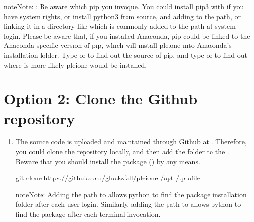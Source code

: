\documentclass[letterpaper,10pt,english]{sphinxmanual}
\begin{document}
\begin{enumerate}
\begin{sphinxadmonition}{note}{Note:}
:
Be aware which pip you invoque. You could install pip3 with
 if you have system rights, or
install python3 from source, and adding  to the
path, or linking it in a directory like  which is commonly
added to the path at system login. Please be aware that, if you installed
Anaconda, pip could be linked to the Anaconda specific version of pip, which
will install pleione into Anaconda’s installation folder.
Type  or  to find out the source of pip, and type
 or  to find out where is more likely
pleione would be installed.
\end{sphinxadmonition}

\end{enumerate}


\section{Option 2: Clone the Github repository}
\label{\detokenize{Installation:option-2-clone-the-github-repository}}\begin{enumerate}
\def\theenumi{\arabic{enumi}}
\def\labelenumi{\theenumi .}
\makeatletter\def\p@enumii{\p@enumi \theenumi .}\makeatother
\item {} 

The source code is uploaded and maintained through Github at
. Therefore, you could clone the
repository locally, and then add the folder to the . Beware
that you should install the  package () by any means.

\begin{sphinxVerbatim}[commandchars=\\\{\}]
git clone https://github.com/glucksfall/pleione /opt
   \PYGZgt{}\PYGZgt{} /.profile
\end{sphinxVerbatim}

\begin{sphinxadmonition}{note}{Note:}
Adding the path to  allows python to find the package
installation folder after each user login. Similarly, adding the path to
 allows python to find the package after each terminal
invocation.
\end{sphinxadmonition}

\end{enumerate}
\end{document}
